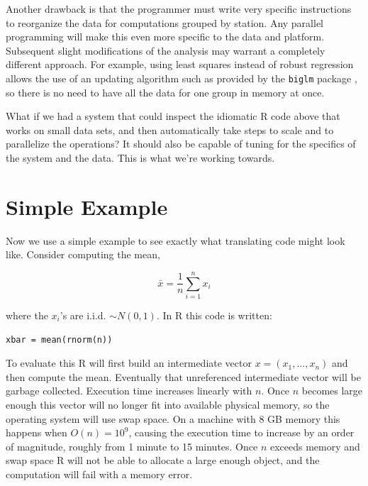 \documentclass[12pt]{article}
\begin{document}
Another drawback is that the programmer must write very specific
instructions to reorganize the data for computations grouped by station.
Any parallel programming will make this even more specific to the data and
platform. Subsequent slight modifications of the analysis may warrant a
completely different approach. For example, using least squares instead of
robust regression allows the use of an updating algorithm such as provided
by the \texttt{biglm} package \cite{R-biglm}, so there is no need to have
all the data for one group in memory at once.

What if we had a system that could inspect the idiomatic R code above that
works on small data sets, and then automatically take steps to scale and to
parallelize the operations? It should also be capable of tuning for the
specifics of the system and the data. This is what we're working towards.

\section{Simple Example}


Now we use a simple example to see exactly what translating code might look
like.  Consider computing the mean,

\begin{equation}
    \bar{x} = \frac{1}{n} \sum_{i = 1}^n x_i
\label{eq:mean}
\end{equation}

where the $x_i$'s are
i.i.d. $\sim N(0, 1)$.  In R this code is written:

\begin{verbatim}
xbar = mean(rnorm(n))
\end{verbatim}

To evaluate this R will first build an intermediate vector $x = (x_1,
\dots, x_n)$ and then compute the mean. Eventually that unreferenced
intermediate vector will be garbage collected.
Execution time increases
linearly with $n$. Once $n$ becomes large
enough this vector will no longer fit into available physical memory, so
the operating system will use swap space. On a machine with 8 GB memory
this happens when $O(n) = 10^9$, causing the execution time
to increase by an order of magnitude, roughly from 1 minute to 15
minutes. Once $n$ exceeds memory and swap space R will not be able to allocate a
large enough object, and the computation will fail with a memory error.
\end{document}
